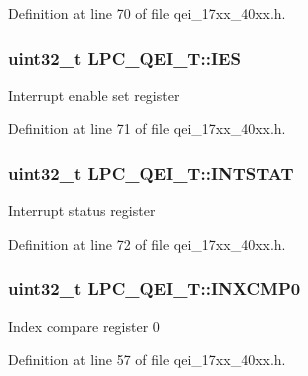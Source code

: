 Definition at line 70 of file qei\+\_\+17xx\+\_\+40xx.\+h.

\subsubsection[{\texorpdfstring{I\+ES}{IES}}]{ uint32\+\_\+t L\+P\+C\+\_\+\+Q\+E\+I\+\_\+\+T\+::\+I\+ES}\hypertarget{structLPC__QEI__T_a2eab592cbea507455a7aaab9a5ab6d53}{}\label{structLPC__QEI__T_a2eab592cbea507455a7aaab9a5ab6d53}
Interrupt enable set register 

Definition at line 71 of file qei\+\_\+17xx\+\_\+40xx.\+h.

\subsubsection[{\texorpdfstring{I\+N\+T\+S\+T\+AT}{INTSTAT}}]{ uint32\+\_\+t L\+P\+C\+\_\+\+Q\+E\+I\+\_\+\+T\+::\+I\+N\+T\+S\+T\+AT}\hypertarget{structLPC__QEI__T_a550a4e26c5e38589e8722dc3064478a5}{}\label{structLPC__QEI__T_a550a4e26c5e38589e8722dc3064478a5}
Interrupt status register 

Definition at line 72 of file qei\+\_\+17xx\+\_\+40xx.\+h.

\subsubsection[{\texorpdfstring{I\+N\+X\+C\+M\+P0}{INXCMP0}}]{ uint32\+\_\+t L\+P\+C\+\_\+\+Q\+E\+I\+\_\+\+T\+::\+I\+N\+X\+C\+M\+P0}\hypertarget{structLPC__QEI__T_abb45974ac42d27676c2b3c08d9f9aad0}{}\label{structLPC__QEI__T_abb45974ac42d27676c2b3c08d9f9aad0}
Index compare register 0 

Definition at line 57 of file qei\+\_\+17xx\+\_\+40xx.\+h.

